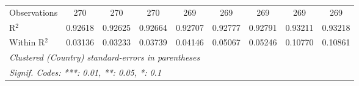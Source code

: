 \begin{table}[htbp]
\begin{tabular}{lcccccccc}
      Observations                            & 270             & 270            & 270      & 269      & 269      & 269      & 269      & 269\\  
      R$^2$                                   & 0.92618         & 0.92625        & 0.92664  & 0.92707  & 0.92777  & 0.92791  & 0.93211  & 0.93218\\  
      Within R$^2$                            & 0.03136         & 0.03233        & 0.03739  & 0.04146  & 0.05067  & 0.05246  & 0.10770  & 0.10861\\  
      \midrule \midrule
      \multicolumn{9}{l}{\emph{Clustered (Country) standard-errors in parentheses}}\\
      \multicolumn{9}{l}{\emph{Signif. Codes: ***: 0.01, **: 0.05, *: 0.1}}\\
   \end{tabular}
\end{table}


